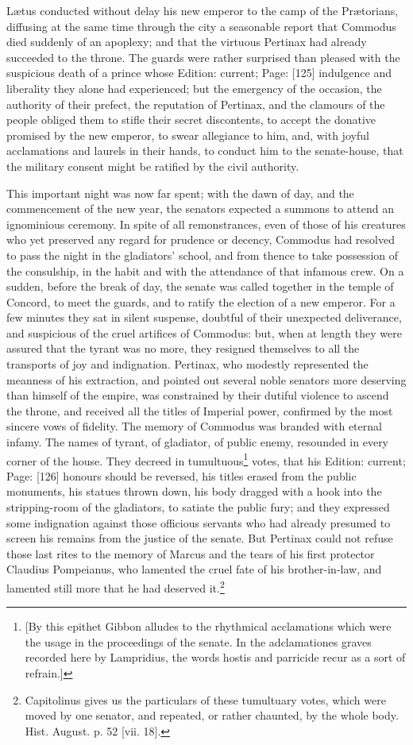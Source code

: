 Lætus conducted without delay his new emperor to the camp of the Prætorians, diffusing at the same time through the city a seasonable report that Commodus died suddenly of an apoplexy; and that the virtuous Pertinax had already succeeded to the throne. The guards were rather surprised than pleased with the suspicious death of a prince whose Edition: current; Page: [125] indulgence and liberality they alone had experienced; but the emergency of the occasion, the authority of their prefect, the reputation of Pertinax, and the clamours of the people obliged them to stifle their secret discontents, to accept the donative promised by the new emperor, to swear allegiance to him, and, with joyful acclamations and laurels in their hands, to conduct him to the senate-house, that the military consent might be ratified by the civil authority.

This important night was now far spent; with the dawn of day, and the commencement of the new year, the senators expected a summons to attend an ignominious ceremony. In spite of all remonstrances, even of those of his creatures who yet preserved any regard for prudence or decency, Commodus had resolved to pass the night in the gladiators\texthebrew{}’ school, and from thence to take possession of the consulship, in the habit and with the attendance of that infamous crew. On a sudden, before the break of day, the senate was called together in the temple of Concord, to meet the guards, and to ratify the election of a new emperor. For a few minutes they sat in silent suspense, doubtful of their unexpected deliverance, and suspicious of the cruel artifices of Commodus: but, when at length they were assured that the tyrant was no more, they resigned themselves to all the transports of joy and indignation. Pertinax, who modestly represented the meanness of his extraction, and pointed out several noble senators more deserving than himself of the empire, was constrained by their dutiful violence to ascend the throne, and received all the titles of Imperial power, confirmed by the most sincere vows of fidelity. The memory of Commodus was branded with eternal infamy. The names of tyrant, of gladiator, of public enemy, resounded in every corner of the house. They decreed in tumultuous\footnote{[By this epithet Gibbon alludes to the rhythmical acclamations which were the usage in the proceedings of the senate. In the adclamationes graves recorded here by Lampridius, the words hostis and parricide recur as a sort of refrain.]} votes, that his Edition: current; Page: [126] honours should be reversed, his titles erased from the public monuments, his statues thrown down, his body dragged with a hook into the stripping-room of the gladiators, to satiate the public fury; and they expressed some indignation against those officious servants who had already presumed to screen his remains from the justice of the senate. But Pertinax could not refuse those last rites to the memory of Marcus and the tears of his first protector Claudius Pompeianus, who lamented the cruel fate of his brother-in-law, and lamented still more that he had deserved it.\footnote{Capitolinus gives us the particulars of these tumultuary votes, which were moved by one senator, and repeated, or rather chaunted, by the whole body. Hist. August. p. 52 [vii. 18].}

